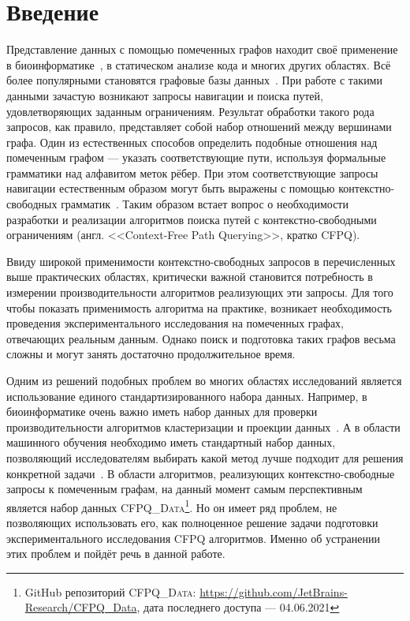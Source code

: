\section*{Введение}
Представление данных с помощью помеченных графов находит своё применение в биоинформатике~\cite{QVCRNASSP}, в статическом анализе кода и многих других областях.
Всё более популярными становятся графовые базы данных~\cite{FRSPGD}.
При работе с такими данными зачастую возникают запросы навигации и поиска путей, удовлетворяющих заданным ограничениям.
Результат обработки такого рода запросов, как правило, представляет собой набор отношений между вершинами графа.
Один из естественных способов определить подобные отношения над помеченным графом --- указать соответствующие пути, используя формальные грамматики над алфавитом меток рёбер.
При этом соответствующие запросы навигации естественным образом могут быть выражены с помощью кон\-текст\-но-свобод\-ных грамматик~\cite{GTMIDT}.
Таким образом встает вопрос о необходимости разработки и реализации алгоритмов поиска путей с кон\-текст\-но-свобод\-ными ограничениям (англ. <<Context-Free Path Querying>>, кратко CFPQ). 

Ввиду широкой применимости кон\-текст\-но-свобод\-ных запросов в перечисленных выше практических областях, критически важной становится потребность в измерении производительности алгоритмов реализующих эти запросы.
Для того чтобы показать применимость алгоритма на практике, возникает необходимость проведения экспериментального исследования на помеченных графах, отвечающих реальным данным.
Однако поиск и подготовка таких графов весьма сложны и могут занять достаточно продолжительное время.

Одним из решений подобных проблем во многих областях исследований является использование единого стандартизированного набора данных.
Например, в биоинформатике очень важно иметь набор данных для проверки производительности алгоритмов кластеризации и проекции данных~\cite{FCPS}.
А в области машинного обучения необходимо иметь стандартный набор данных, позволяющий исследователям выбирать какой метод лучше подходит для решения конкретной задачи~\cite{PMLBDBLP}.
В области алгоритмов, реализующих кон\-текстно-свобод\-ные запросы к помеченным графам, на данный момент самым перспективным является набор данных \textsc{CFPQ\_Data}\footnote{GitHub репозиторий \textsc{CFPQ\_Data}: \url{https://github.com/JetBrains-Research/CFPQ_Data}, дата последнего доступа --- 04.06.2021}.
Но он имеет ряд проблем, не позволяющих использовать его, как полноценное решение задачи подготовки экспериментального исследования CFPQ алгоритмов.
Именно об устранении этих проблем и пойдёт речь в данной работе.
